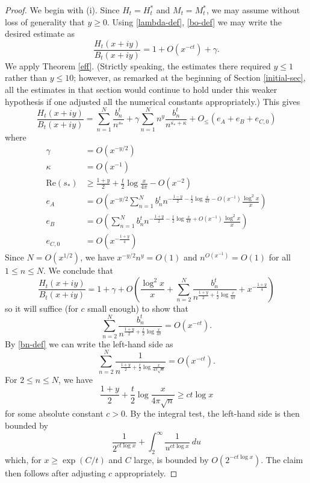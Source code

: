 \begin{proof}  We begin with (i).  Since $H_t = H_t^*$ and $M_t = M_t^*$, we may assume without loss of generality that $y \geq 0$.
Using \eqref{lambda-def}, \eqref{bo-def} we may write the desired estimate as
$$ \frac{H_t(x+iy)}{B_t(x+iy)} = 1 + O(x^{-ct}) + \gamma.$$
We apply Theorem \ref{eff}.  (Strictly speaking, the estimates there required $y \leq 1$ rather than $y \leq 10$; however, as remarked at the beginning of Section \ref{initial-sec}, all the estimates in that section would continue to hold under this weaker hypothesis if one adjusted all the numerical constants appropriately.)  This gives
\begin{equation}\label{exp}
\frac{H_t(x+iy)}{B_t(x+iy)} = \sum_{n=1}^N \frac{b_n^t}{n^{s_*}} + \gamma \sum_{n=1}^N n^y \frac{b_n^t}{n^{\overline{s_*} + \kappa}} + O_{\leq}\left( e_A + e_B + e_{C,0} \right)
\end{equation}
where
\begin{align*}
\gamma &= O( x^{-y/2} ) \\
\kappa &= O(x^{-1}) \\
\mathrm{Re}(s_*) &\geq \frac{1+y}{2} + \frac{t}{2} \log \frac{x}{4\pi}  - O(x^{-2}) \\
e_A &= O\left( x^{-y/2} \sum_{n=1}^N b_n^t n^{-\frac{1-y}{2} - \frac{t}{2} \log \frac{x}{4\pi} - O(x^{-1})} \frac{\log^2 x}{x} \right) \\ 
e_B &= O\left( \sum_{n=1}^N b_n^t n^{-\frac{1+y}{2} - \frac{t}{2} \log \frac{x}{4\pi} + O(x^{-1})} \frac{\log^2 x}{x} \right) \\ 
e_{C,0} &= O\left( x^{-\frac{1+y}{4}} \right)
\end{align*}
Since $N = O(x^{1/2})$, we have $x^{-y/2} n^{y} = O(1)$ and $n^{O(x^{-1})} = O(1)$ for all $1 \leq n \leq N$.  We conclude that
$$\frac{H_t(x+iy)}{B_t(x+iy)} = 1 + \gamma + O\left( \frac{\log^2 x}{x} + \sum_{n=2}^N \frac{b_n^t}{n^{\frac{1+y}{2} + \frac{t}{2} \log \frac{x}{4\pi}}} + x^{-\frac{1+y}{4}} \right) $$
so it will suffice (for $c$ small enough) to show that
$$ \sum_{n=2}^N \frac{b_n^t}{n^{\frac{1+y}{2} + \frac{t}{2} \log \frac{x}{4\pi}}} = O( x^{-ct} ).$$
By \eqref{bn-def} we can write the left-hand side as
$$ \sum_{n=2}^N \frac{1}{n^{\frac{1+y}{2} + \frac{t}{2} \log \frac{x}{4\pi \sqrt{n}}}} = O( x^{-ct} ).$$
For $2 \leq n \leq N$, we have
$$ \frac{1+y}{2} + \frac{t}{2} \log \frac{x}{4\pi \sqrt{n}} \geq c t \log x $$
for some absolute constant $c>0$.  By the integral test, the left-hand side is then bounded by
$$ \frac{1}{2^{c t \log x}} + \int_2^\infty \frac{1}{u^{c t \log x}}\ du$$
which, for $x \geq \exp(C/t)$ and $C$ large, is bounded by $O(2^{-ct\log x})$.  The claim then follows after adjusting $c$ appropriately.


\end{proof}

